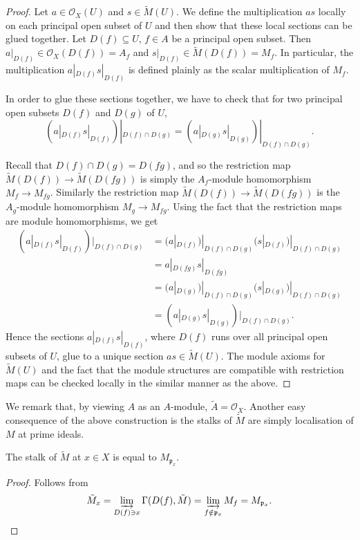 \begin{proof}
	Let $a \in \mathcal{O}_X(U)$ and $s \in \tilde{M}(U)$. We define the multiplication $as$ locally on each principal open subset of $U$ and then show that these local sections can be glued together. Let $D(f) \subseteq U$, $f \in A$ be a principal open subset. Then $a|_{D(f)} \in \mathcal{O}_X(D(f)) = A_f$ and $s|_{D(f)} \in \tilde{M}(D(f)) = M_f$. In particular, the multiplication $a|_{D(f)} s|_{D(f)}$ is defined plainly as the scalar multiplication of $M_f$.
	
	In order to glue these sections together, we have to check that for two principal open subsets $D(f)$ and $D(g)$ of $U$, 
	\begin{equation*}
		(a|_{D(f)}s|_{D(f)})|_{D(f) \cap D(g)} = (a|_{D(g)}s|_{D(g)})|_{D(f) \cap D(g)}.
	\end{equation*}
	
	Recall that $D(f) \cap D(g) = D(fg)$, and so the restriction map $\tilde{M}(D(f)) \to \tilde{M}(D(fg))$ is simply the $A_f$-module homomorphism $M_f \to M_{fg}$. Similarly the restriction map $\tilde{M}(D(f)) \to \tilde{M}(D(fg))$ is the $A_g$-module homomorphism $M_g \to M_{fg}$. Using the fact that the restriction maps are module homomorphisms, we get
	\begin{align*}
		(a|_{D(f)}s|_{D(f)})|_{D(f) \cap D(g)} & = (a|_{D(f)})|_{D(f) \cap D(g)}(s|_{D(f)})|_{D(f) \cap D(g)} \\
		& = a|_{D(fg)} s|_{D(fg)} \\
		& = (a|_{D(g)})|_{D(f) \cap D(g)}(s|_{D(g)})|_{D(f) \cap D(g)} \\
		& = (a|_{D(g)}s|_{D(g)})|_{D(f) \cap D(g)}.
	\end{align*}
	Hence the sections $a|_{D(f)}s|_{D(f)}$, where $D(f)$ runs over all principal open subsets of $U$, glue to a unique section $as \in \tilde{M}(U)$. The module axioms for $\tilde{M}(U)$ and the fact that the module structures are compatible with restriction maps can be checked locally in the similar manner as the above.
\end{proof}

We remark that, by viewing $A$ as an $A$-module, $\tilde{A} = \mathcal{O}_X$. Another easy consequence of the above construction is the stalks of $\tilde{M}$ are simply localisation of $M$ at prime ideals.

\begin{lemma}\label{chap11:stalk-of-associated-module}
	The stalk of $\tilde{M}$ at $x \in X$ is equal to $M_{\mathfrak{p}_x}$.
\end{lemma}
\begin{proof}
	Follows from
	\begin{equation*}
		\tilde{M}_x = \varinjlim_{D(f) \ni x} \Gamma(D(f), \tilde{M}) = \varinjlim_{f \notin \mathfrak{p}_x} M_f = M_{\mathfrak{p}_x}.
	\end{equation*}
\end{proof}


